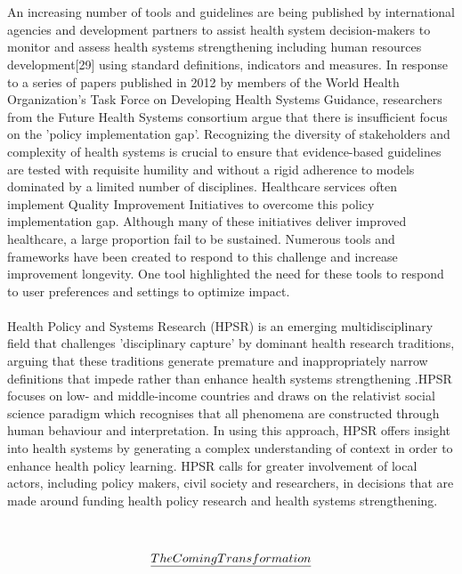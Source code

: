 \documentclass[12pt]{article}
\begin{document}
\\
\\
An increasing number of tools and guidelines are being published by international agencies and development partners to assist health system decision-makers to monitor and assess health systems strengthening including human resources development[29] using standard definitions, indicators and measures. In response to a series of papers published in 2012 by members of the World Health Organization's Task Force on Developing Health Systems Guidance, researchers from the Future Health Systems consortium argue that there is insufficient focus on the 'policy implementation gap'. Recognizing the diversity of stakeholders and complexity of health systems is crucial to ensure that evidence-based guidelines are tested with requisite humility and without a rigid adherence to models dominated by a limited number of disciplines. Healthcare services often implement Quality Improvement Initiatives to overcome this policy implementation gap. Although many of these initiatives deliver improved healthcare, a large proportion fail to be sustained. Numerous tools and frameworks have been created to respond to this challenge and increase improvement longevity. One tool highlighted the need for these tools to respond to user preferences and settings to optimize impact.
\\
\\
Health Policy and Systems Research (HPSR) is an emerging multidisciplinary field that challenges 'disciplinary capture' by dominant health research traditions, arguing that these traditions generate premature and inappropriately narrow definitions that impede rather than enhance health systems strengthening .HPSR focuses on low- and middle-income countries and draws on the relativist social science paradigm which recognises that all phenomena are constructed through human behaviour and interpretation. In using this approach, HPSR offers insight into health systems by generating a complex understanding of context in order to enhance health policy learning. HPSR calls for greater involvement of local actors, including policy makers, civil society and researchers, in decisions that are made around funding health policy research and health systems strengthening.
\\
\\
\\
\begin{align}
  \LARGE{\underline{The Coming Transformation}}  
\end{align}
\\
\end{document}
